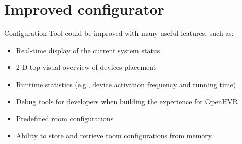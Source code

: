 \section{Improved configurator}

Configuration Tool could be improved with many useful features, such as:

\begin{itemize}
    \item Real-time display of the current system status
    \item 2-D top visual overview of devices placement
    \item Runtime statistics (e.g., device activation frequency and running time)
    \item Debug tools for developers when building the experience for OpenHVR
    \item Predefined room configurations
    \item Ability to store and retrieve room configurations from memory
\end{itemize}